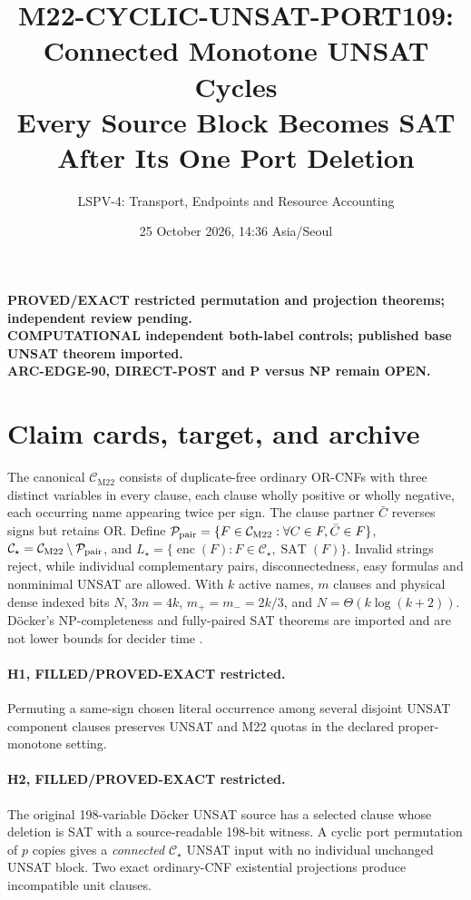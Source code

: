\documentclass[11pt]{article}
\title{M22-CYCLIC-UNSAT-PORT109: Connected Monotone UNSAT Cycles\\
\large Every Source Block Becomes SAT After Its One Port Deletion}
\author{LSPV-4: Transport, Endpoints and Resource Accounting}
\date{25 October 2026, 14:36 Asia/Seoul}
\newcommand{\CM}{\mathcal C_{\mathrm{M22}}}
\newcommand{\CS}{\mathcal C_\star}
\begin{document}
\maketitle
\begin{center}
\textbf{PROVED/EXACT restricted permutation and projection theorems; independent review pending.}\\
\textbf{COMPUTATIONAL independent both-label controls; published base UNSAT theorem imported.}\\
\textbf{ARC-EDGE-90, DIRECT-POST and P versus NP remain OPEN.}
\end{center}

\section{Claim cards, target, and archive}
The canonical \(\CM\) consists of duplicate-free ordinary OR-CNFs with three distinct variables in every clause, each clause wholly positive or wholly negative, each occurring name appearing twice per sign. The clause partner \(\bar C\) reverses signs but retains OR. Define \(\mathcal P_{\rm pair}=\{F\in\CM:\forall C\in F,\bar C\in F\}\), \(\CS=\CM\setminus\mathcal P_{\rm pair}\), and \(L_\star=\{\operatorname{enc}(F):F\in\CS,\operatorname{SAT}(F)\}\). Invalid strings reject, while individual complementary pairs, disconnectedness, easy formulas and nonminimal UNSAT are allowed. With \(k\) active names, \(m\) clauses and physical dense indexed bits \(N\), \(3m=4k\), \(m_+=m_-=2k/3\), and \(N=\Theta(k\log(k+2))\). D\"ocker's NP-completeness and fully-paired SAT theorems are imported and are not lower bounds for decider time \cite{dock}.

\paragraph{H1, FILLED/PROVED-EXACT restricted.} Permuting a same-sign chosen literal occurrence among several disjoint UNSAT component clauses preserves UNSAT and M22 quotas in the declared proper-monotone setting.

\paragraph{H2, FILLED/PROVED-EXACT restricted.} The original 198-variable D\"ocker UNSAT source has a selected clause whose deletion is SAT with a source-readable 198-bit witness. A cyclic port permutation of \(p\) copies gives a \emph{connected} \(\CS\) UNSAT input with no individual unchanged UNSAT block. Two exact ordinary-CNF existential projections produce incompatible unit clauses.
\end{document}

